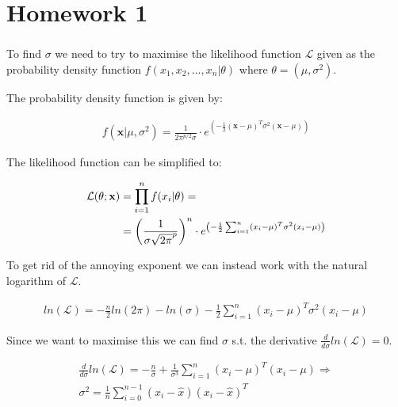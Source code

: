 \documentclass{article}
\begin{document}
\chapter{Homework 1}
\setcounter{section}{1}
\subsection{}

To find $\sigma$ we need to try to maximise the likelihood function
$\mathcal{L}$ given as the probability density function $f(x_1, x_2, ... , x_n
\vert \theta)$ where $\theta = (\mu, \sigma^2)$.

The probability density function is given by:

\begin{align}
  f(\mathbf{x} \vert \mu , \sigma^2) = \frac{1}{2\pi^{p / 2} \sigma}
  \cdot e^{\left( - \frac{1}{2} \left( \mathbf{x} - \mu \right) ^T
  \sigma^2 \left(\mathbf{x} - \mu \right) \right)}
\end{align}

The likelihood function can be simplified to:

\begin{align}
  \mathcal{L}(\theta ; \mathbf{x}) &= \prod_{i = 1}^{n}f(x_i \vert \theta) =\\
  \notag &= \left( \frac{1}{\sigma\sqrt{2\pi}^{p}} \right) ^n
    \cdot e^{\left( - \frac{1}{2} \sum_{i = 1}^{n}
    \notag \left( x_i - \mu \right) ^T \sigma^2 \left(x_i - \mu \right) \right)}
\end{align}

To get rid of the annoying exponent we can instead work with the natural
logarithm of $\mathcal{L}$.

\begin{align}
  ln(\mathcal{L}) = - \frac{n}{2} ln(2\pi) - ln(\sigma)
    - \frac{1}{2} \sum_{i = 1}^{n}
    \left( x_i - \mu \right) ^T \sigma^2 \left(x_i - \mu \right)
\end{align}

Since we want to maximise this we can find $\sigma$ s.t. the derivative
$\frac{d}{d\sigma}ln(\mathcal{L}) = 0$.

\begin{align}
  \frac{d}{d\sigma}ln(\mathcal{L}) = -\frac{n}{\sigma} + \frac{1}{\sigma^3}
  \sum_{i = 1}^{n} \left( x_i - \mu \right) ^T \left(x_i - \mu \right) \Rightarrow \\
  \sigma^2 = \frac{1}{n} \sum_{i = 0}^{n - 1}
    \left( x_i - \hat{x} \right) \left(x_i - \hat{x} \right)^T
\end{align}
\end{document}

